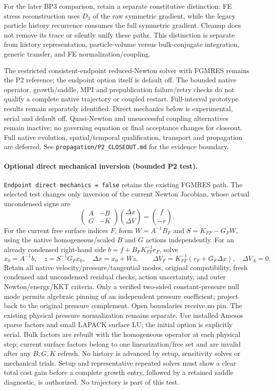 \documentclass[11pt]{article}
\begin{document}
For the later BP3 comparison, retain a separate constitutive distinction:
FE stress reconstruction uses $D_3$ of the raw symmetric gradient, while the
legacy particle history recurrence consumes the full symmetric gradient.
Cleanup does not remove its trace or silently unify these paths. This
distinction is separate from history representation, particle-volume versus
bulk-conjugate integration, generic transfer, and FE normalization/coupling.

The restricted consistent-endpoint reduced-Newton solver with FGMRES remains
the P2 reference; the endpoint option itself is default off. The bounded native
operator, growth/saddle, MPI and prepublication failure/retry checks do not
qualify a complete native trajectory or coupled restart. Full-interval prototype
results remain separately identified. Direct mechanics below is experimental,
serial and default off. Quasi-Newton and unsuccessful coupling alternatives
remain inactive; no governing equation or final acceptance changes for closeout.
Full native evolution, spatial/temporal qualification, transport and propagation
are deferred. See \texttt{propagation/P2\_CLOSEOUT.md} for the evidence boundary.

\paragraph{Optional direct mechanical inversion (bounded P2 test).}
\texttt{Endpoint direct mechanics = false} retains the existing FGMRES path.
The selected test changes only inversion of the current Newton Jacobian,
whose actual uncondensed signs are
\[
 \begin{pmatrix}A&-B\\G&-K\end{pmatrix}
 \binom{\Delta x}{\Delta V}=\binom{f}{-r}.
\]
For the current free surface indices $F$, form $W=A^{-1}B_F$ and
$S=K_{FF}-G_FW$, using the native homogeneous/scaled $B$ and $G$ actions
independently. For an already condensed right-hand side
$b=f+B_FK_{FF}^{-1}r_F$, solve
\[
 x_0=A^{-1}b,\quad z=S^{-1}G_Fx_0,\quad
 \Delta x=x_0+Wz,\qquad
 \Delta V_F=K_{FF}^{-1}(r_F+G_F\Delta x),\quad\Delta V_A=0.
\]
Retain all native velocity/pressure/tangential modes, original compatibility,
fresh condensed and uncondensed residual checks, action uncertainty, and outer
Newton/energy/KKT criteria. Only a verified two-sided constant-pressure null
mode permits algebraic pinning of an independent pressure coefficient; project
back to the original pressure complement. Open boundaries receive no pin.
The existing physical pressure normalization remains separate.
Use installed Amesos sparse factors and small LAPACK surface LU; the initial
option is explicitly serial. Bulk factors are rebuilt with the homogeneous
operator at each physical step; current surface factors belong to one
linearization/free set and are invalid after any $B,G,K$ refresh. No history
is advanced by setup, sensitivity solves or mechanical trials. Setup and
representative repeated solves must show a clear total cost gain before a
complete growth entry, followed by a retained saddle diagnostic, is authorized.
No trajectory is part of this test.
\end{document}
